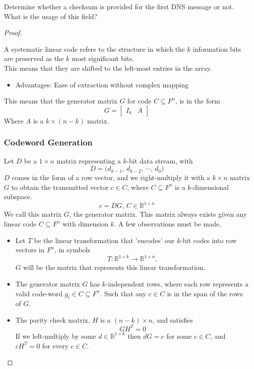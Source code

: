 \documentclass[../../main.tex]{subfiles}
\begin{document}
\begin{wts}
Determine whether a checksum is provided for the first DNS message or not. What is the usage of this field?
\end{wts}
\begin{proof}
\begin{definition}
    A systematic linear code refers to the structure in which the $k$ information bits are preserved as the $k$ most significant bits.\\
    
    This means that they are shifted to the left-most entries in the array.
    \begin{itemize}
        \item Advantages: Ease of extraction without complex mapping
    \end{itemize}
    This means that the generator matrix $G$ for code $C\subseteq F^n$, is in the form
    \[
    G = \begin{bmatrix}I_k& A\end{bmatrix}
    \]
    Where $A$ is a $k\times (n-k)$ matrix.
\end{definition}

\subsubsection*{Codeword Generation}
Let $D$ be a $1\times n$ matrix representing a $k$-bit data stream, with
\[
D = \biggl(d_{k-1},\,d_{k-2},\,\cdots,\,d_0\biggr)
\]
$D$ comes in the form of a row vector, and we right-multiply it with a $k\times n$ matrix $G$ to obtain the transmitted vector $c\in C$, where $C\subseteq F^n$ is a $k$-dimensional subspace.
\[
c = DG,\,C\in \mathbb{B}^{1\times n}
\]
We call this matrix $G$, the generator matrix. This matrix always exists given any linear code $C\subseteq F^n$ with dimension $k$. A few observations must be made,
\begin{itemize}
    \item Let $T$ be the linear transformation that 'encodes' our $k$-bit codes into row vectors in $F^n$, in symbols
    \[
    T: \mathbb{B}^{1\times k}\to \mathbb{B}^{1\times n},
    \]
    $G$ will be the matrix that represents this linear transformation. 
    \item The generator matrix $G$ has $k$-independent rows, where each row represents a valid code-word $g_i\in C\subseteq F^n$. Such that any $c\in C$ is in the span of the rows of $G$.
    \item The parity check matrix, $H$ is a $(n-k)\times n$, and satisfies
    \[
    GH^T =0
    \]
    If we left-multiply by some $d\in\mathbb{B}^{1\times k}$ then $dG=c$ for some $c\in C$, and $cH^T = 0$ for every $c\in C$.\\
    

\end{itemize}
\end{proof}
\end{document}
